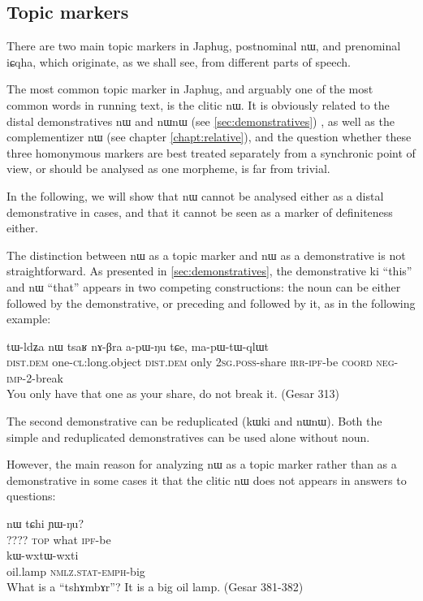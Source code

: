 \documentclass[oldfontcommands,oneside,a4paper,11pt]{memoir}
\newcommand{\ipa}[1]{{\phon #1}} %
\newcommand{\cl}{\textsc{cl}}
\newcommand{\coord}{\textsc{coord}}
\newcommand{\dem}{\textsc{dem}}
\newcommand{\dist}{\textsc{dist}}
\newcommand{\emphat}{\textsc{emph}}
\newcommand{\imp}{\textsc{imp}}
\newcommand{\ipf}{\textsc{ipf}}
\newcommand{\irr}{\textsc{irr}}
\newcommand{\negat}{\textsc{neg}}
\newcommand{\nmlz}{\textsc{nmlz}}
\newcommand{\poss}{\textsc{poss}}
\newcommand{\sg}{\textsc{sg}}
\newcommand{\stat}{\textsc{stat}}
\newcommand{\topic}{\textsc{top}}
\begin{document}
\subsection{Topic markers} 
There are two main topic markers in Japhug, postnominal \ipa{nɯ}, and prenominal \ipa{iɕqha}, which originate, as we shall see, from different parts of speech.

The most common topic marker in Japhug, and arguably one of the most common words in running text, is the clitic \ipa{nɯ}. It is obviously related to the distal demonstratives \ipa{nɯ} and \ipa{nɯnɯ} (see \ref{sec:demonstratives}) , as well as the complementizer \ipa{nɯ} (see chapter \ref{chapt:relative}), and the question whether these  three homonymous markers are best treated separately from a synchronic point of view, or should be analysed as one morpheme, is far from trivial. 

In the following, we will show that \ipa{nɯ} cannot be analysed either as a distal demonstrative in cases, and that it cannot be seen as a marker of definiteness either.

The distinction between \ipa{nɯ} as a topic marker and \ipa{nɯ} as a demonstrative is not straightforward. As presented in \ref{sec:demonstratives}, the demonstrative \ipa{ki} ``this'' and \ipa{nɯ} ``that'' appears in two competing constructions: the noun can be either followed by the demonstrative, or preceding and followed by it, as in the following example:

\begin{exe}	
\ex	
\gll  \ipa{nɯ}  	\ipa{tɯ-ldʑa}  	\ipa{nɯ}  	\ipa{tsaʁ}  	\ipa{nɤ-βra}  	\ipa{a-pɯ-ŋu}  	\ipa{tɕe,}  	\ipa{ma-pɯ-tɯ-qlɯt}  \\
 \dist{}.\dem{} one-\cl{}:long.object \dist{}.\dem{} only 2\sg{}.\poss{}-share  \irr{}-\ipf{}-be \coord{} \negat{}-\imp{}-2-break   \\
 \glt 	  You only have that one as your share, do not break it. (Gesar 313)
\end{exe} 	
The second demonstrative can be reduplicated (\ipa{kɯki} and \ipa{nɯnɯ}). Both the simple and reduplicated demonstratives can be used alone without noun. 

However, the main reason for analyzing \ipa{nɯ} as a topic marker rather than as a demonstrative in some cases it that the clitic \ipa{nɯ} does not appears in answers to questions:

 
 \begin{exe}	
\ex	
\gll  \ipa{tshɤmbɤr}  	\ipa{nɯ}  	\ipa{tɕhi}  	\ipa{ɲɯ-ŋu?}     \\
   ???? \topic{} what \ipf{}-be   \\
     \gll  \ipa{rkɯwɯ}  	\ipa{kɯ-wxtɯ-wxti}  	   \\
  oil.lamp \nmlz{}.\stat{}-\emphat{}-big     \\
 \glt 	 What is a ``tshɤmbɤr''? It is a big oil lamp. (Gesar 381-382)
\end{exe} 	
 
\end{document}
